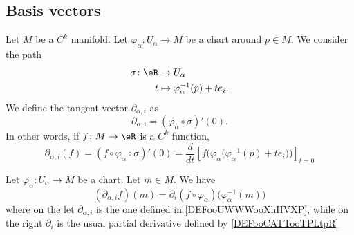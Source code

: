 \subsection{Basis vectors}

\begin{definition}		\label{DEFooUWWWooXhHVXP}
	Let \( M\) be a \( C^k\) manifold. Let \(\varphi_{\alpha}\colon U_{\alpha} \to M  \) be a chart around \( p\in M\). We consider the path
	\begin{equation}
		\begin{aligned}
			\sigma\colon \eR & \to U_{\alpha}                         \\
			t                & \mapsto \varphi_{\alpha}^{-1}(p)+te_i.
		\end{aligned}
	\end{equation}
	We define the tangent vector \( \partial_{\alpha,i}\) as
	\begin{equation}		\label{EQooHBUBooSuKyLm}
		\partial_{\alpha,i}=(\varphi_{\alpha}\circ\sigma)'(0).
	\end{equation}
	In other words, if \(f \colon M\to \eR  \) is a \( C^k\) function,
	\begin{equation}		\label{EQooLDOGooHbLoMC}
		\partial_{\alpha,i}(f)=(f\circ\varphi_{\alpha}\circ \sigma)'(0)=\frac{d}{dt} \left[f\Big(  \varphi_{\alpha}\big( \varphi_{\alpha}^{-1}(p)+te_i \big)  \Big)\right]_{t=0}
	\end{equation}
\end{definition}


\begin{proposition}	\label{PROPooERIQooBWWbkX}
	Let \(\varphi_{\alpha} \colon U_{\alpha}\to M  \) be a chart. Let \( m\in M\). We have
	\begin{equation}		\label{EQooMCBOooBBupHl}
		(\partial_{\alpha, i}f)(m)=\partial_i(f\circ\varphi_{\alpha})\big( \varphi_{\alpha}^{-1}(m) \big)
	\end{equation}
	where on the let \( \partial_{\alpha,i}\) is the one defined in \ref{DEFooUWWWooXhHVXP}, while on the right \( \partial_i\) is the usual partial derivative defined by \ref{DEFooCATTooTPLtpR}
\end{proposition}

